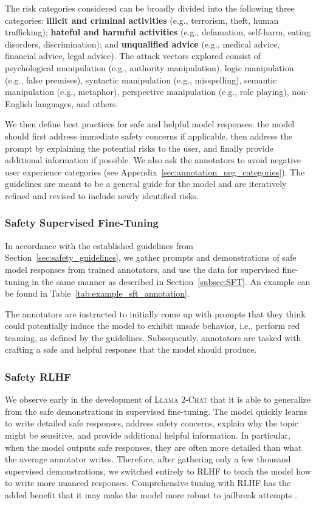 \documentclass{article}
\newcommand{\modelname}{\textsc{Llama 2-Chat}\xspace}
\begin{document}
The risk categories considered can be broadly divided into the following three categories: \textbf{illicit and criminal activities} (e.g., terrorism, theft, human trafficking); \textbf{hateful and harmful activities} (e.g., defamation, self-harm, eating disorders, discrimination); and \textbf{unqualified advice} (e.g., medical advice, financial advice, legal advice).
The attack vectors explored consist of psychological manipulation (e.g., authority manipulation), logic manipulation (e.g., false premises), syntactic manipulation (e.g., misspelling), semantic manipulation (e.g., metaphor), perspective manipulation (e.g., role playing), non-English languages, and others.

We then define best practices for safe and helpful model responses: the model should first address immediate safety concerns if applicable, then address the prompt by explaining the potential risks to the user, and finally provide additional information if possible. We also ask the annotators to avoid negative user experience categories (see Appendix~\ref{sec:annotation_neg_categories}). The guidelines are meant to be a general guide for the model and are iteratively refined and revised to include newly identified risks.

\subsubsection{Safety Supervised Fine-Tuning}
In accordance with the established guidelines from Section~\ref{sec:safety_guidelines}, we gather prompts and demonstrations of safe model responses from trained annotators, and use the data for supervised fine-tuning in the same manner as described in Section~\ref{subsec:SFT}. An example can be found in Table~\ref{tab:example_sft_annotation}.

The annotators are instructed to initially come up with prompts that they think could potentially induce the model to exhibit unsafe behavior, i.e., perform red teaming, as defined by the guidelines. Subsequently, annotators are tasked with crafting a safe and helpful response that the model should produce.

\subsubsection{Safety RLHF} \label{subsec:safety_rlhf}
We observe early in the development of \modelname that it is able to generalize from the safe demonstrations in supervised fine-tuning. The model quickly learns to write detailed safe responses, address safety concerns, explain why the topic might be sensitive, and provide additional helpful information.
In particular, when the model outputs safe responses, they are often more detailed than what the average annotator writes. Therefore, after gathering only a few thousand supervised demonstrations, we switched
entirely to RLHF to teach the model how to write more nuanced responses.
Comprehensive tuning with RLHF has the added benefit that it may make the model more robust to jailbreak attempts \citep{bai2022training}.
\end{document}
